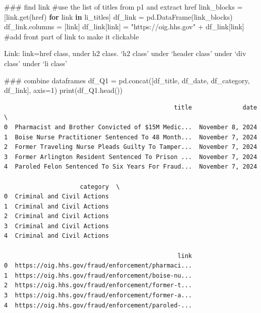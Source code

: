 \documentclass[
  letterpaper,
  DIV=11,
  numbers=noendperiod]{scrartcl}
\newenvironment{Shaded}{\begin{snugshade}}{\end{snugshade}}
\newcommand{\BuiltInTok}[1]{\textcolor[rgb]{0.00,0.23,0.31}{#1}}
\newcommand{\CommentTok}[1]{\textcolor[rgb]{0.37,0.37,0.37}{#1}}
\newcommand{\ControlFlowTok}[1]{\textcolor[rgb]{0.00,0.23,0.31}{\textbf{#1}}}
\newcommand{\DecValTok}[1]{\textcolor[rgb]{0.68,0.00,0.00}{#1}}
\newcommand{\KeywordTok}[1]{\textcolor[rgb]{0.00,0.23,0.31}{\textbf{#1}}}
\newcommand{\NormalTok}[1]{\textcolor[rgb]{0.00,0.23,0.31}{#1}}
\newcommand{\OperatorTok}[1]{\textcolor[rgb]{0.37,0.37,0.37}{#1}}
\newcommand{\StringTok}[1]{\textcolor[rgb]{0.13,0.47,0.30}{#1}}
\begin{document}
\begin{Shaded}
\begin{Highlighting}[]
\CommentTok{\#\#\# find link}
\CommentTok{\#use the list of titles from p1 and extract href}
\NormalTok{link\_blocks }\OperatorTok{=}\NormalTok{ [link.get(}\StringTok{\textquotesingle{}href\textquotesingle{}}\NormalTok{) }\ControlFlowTok{for}\NormalTok{ link }\KeywordTok{in}\NormalTok{ li\_titles]}
\NormalTok{df\_link }\OperatorTok{=}\NormalTok{ pd.DataFrame(link\_blocks)}
\NormalTok{df\_link.columns }\OperatorTok{=}\NormalTok{ [}\StringTok{\textquotesingle{}link\textquotesingle{}}\NormalTok{]}
\NormalTok{df\_link[}\StringTok{\textquotesingle{}link\textquotesingle{}}\NormalTok{] }\OperatorTok{=} \StringTok{"https://oig.hhs.gov"} \OperatorTok{+}\NormalTok{ df\_link[}\StringTok{\textquotesingle{}link\textquotesingle{}}\NormalTok{] }\CommentTok{\#add front part of link to make it clickable}
\end{Highlighting}
\end{Shaded}

Link: link=href class, under h2 class. `h2 class' under `header class'
under `div class' under `li class'

\begin{Shaded}
\begin{Highlighting}[]
\CommentTok{\#\#\# combine dataframes}
\NormalTok{df\_Q1 }\OperatorTok{=}\NormalTok{ pd.concat([df\_title, df\_date, df\_category, df\_link], axis}\OperatorTok{=}\DecValTok{1}\NormalTok{)}
\BuiltInTok{print}\NormalTok{(df\_Q1.head())}
\end{Highlighting}
\end{Shaded}

\begin{verbatim}
                                               title              date  \
0  Pharmacist and Brother Convicted of $15M Medic...  November 8, 2024   
1  Boise Nurse Practitioner Sentenced To 48 Month...  November 7, 2024   
2  Former Traveling Nurse Pleads Guilty To Tamper...  November 7, 2024   
3  Former Arlington Resident Sentenced To Prison ...  November 7, 2024   
4  Paroled Felon Sentenced To Six Years For Fraud...  November 7, 2024   

                     category  \
0  Criminal and Civil Actions   
1  Criminal and Civil Actions   
2  Criminal and Civil Actions   
3  Criminal and Civil Actions   
4  Criminal and Civil Actions   

                                                link  
0  https://oig.hhs.gov/fraud/enforcement/pharmaci...  
1  https://oig.hhs.gov/fraud/enforcement/boise-nu...  
2  https://oig.hhs.gov/fraud/enforcement/former-t...  
3  https://oig.hhs.gov/fraud/enforcement/former-a...  
4  https://oig.hhs.gov/fraud/enforcement/paroled-...  
\end{verbatim}
\end{document}
